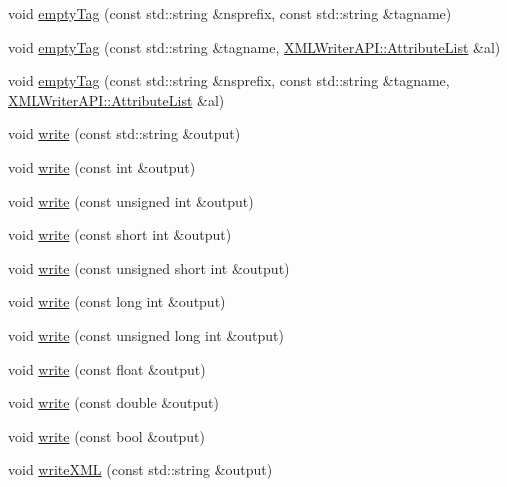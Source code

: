 \begin{DoxyCompactItemize}
void \mbox{\hyperlink{classADATXML_1_1XMLWriter_a7941500f8d733594745588b65ff4789c}{empty\+Tag}} (const std\+::string \&nsprefix, const std\+::string \&tagname)
\item 
void \mbox{\hyperlink{classADATXML_1_1XMLWriter_a48c5adaca1b1c8126047c410c86644f3}{empty\+Tag}} (const std\+::string \&tagname, \mbox{\hyperlink{namespaceXMLWriterAPI_a28cf3d8051a4ccf0aef208b7ebc66d07}{X\+M\+L\+Writer\+A\+P\+I\+::\+Attribute\+List}} \&al)
\item 
void \mbox{\hyperlink{classADATXML_1_1XMLWriter_a7b356346477d6f2e8e2d2db7553147dc}{empty\+Tag}} (const std\+::string \&nsprefix, const std\+::string \&tagname, \mbox{\hyperlink{namespaceXMLWriterAPI_a28cf3d8051a4ccf0aef208b7ebc66d07}{X\+M\+L\+Writer\+A\+P\+I\+::\+Attribute\+List}} \&al)
\item 
void \mbox{\hyperlink{classADATXML_1_1XMLWriter_a82f1a99241ecd26ea2bd7f3d87364ed7}{write}} (const std\+::string \&output)
\item 
void \mbox{\hyperlink{classADATXML_1_1XMLWriter_aa027c8bf616bdc96982bb11a2610469e}{write}} (const int \&output)
\item 
void \mbox{\hyperlink{classADATXML_1_1XMLWriter_a36ebb7ce3a0fde310c457c9520ca961e}{write}} (const unsigned int \&output)
\item 
void \mbox{\hyperlink{classADATXML_1_1XMLWriter_ab29dc20acb63a2ac633b35cc03e6e58f}{write}} (const short int \&output)
\item 
void \mbox{\hyperlink{classADATXML_1_1XMLWriter_a07c953442846b4d1f2d34b00a9371626}{write}} (const unsigned short int \&output)
\item 
void \mbox{\hyperlink{classADATXML_1_1XMLWriter_a39b29ce03b5b71ef853e1952d1899d73}{write}} (const long int \&output)
\item 
void \mbox{\hyperlink{classADATXML_1_1XMLWriter_a5536c007036f96cc720f38199c3ee6a3}{write}} (const unsigned long int \&output)
\item 
void \mbox{\hyperlink{classADATXML_1_1XMLWriter_adafcb9ed0bb0a4de7a590d877ada4d6f}{write}} (const float \&output)
\item 
void \mbox{\hyperlink{classADATXML_1_1XMLWriter_a54aeec25255feb2aa7063885ca48aa7e}{write}} (const double \&output)
\item 
void \mbox{\hyperlink{classADATXML_1_1XMLWriter_af2cc624cb1450f5b6f430573b626e73e}{write}} (const bool \&output)
\item 
void \mbox{\hyperlink{classADATXML_1_1XMLWriter_a887415a6f26bde42e76af7d831087c7e}{write\+X\+ML}} (const std\+::string \&output)

\end{DoxyCompactItemize}
